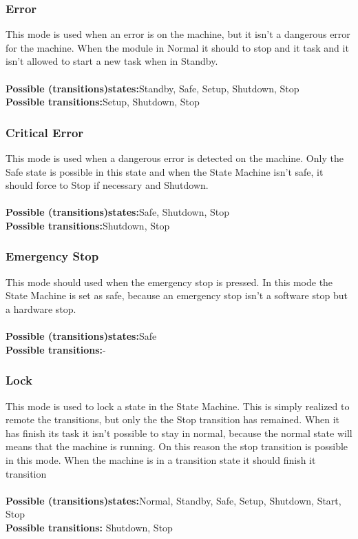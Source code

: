 \documentclass[12pt,a4paper]{report}
\begin{document}
\subsubsection{Error}This mode is used when an error is on the machine, but it isn't a dangerous error for the machine. When the module in Normal it should to stop and it task and it isn't allowed to start a new task when in Standby.\\\\
\textbf{Possible (transitions)states:}Standby, Safe, Setup, Shutdown, Stop\\
\textbf{Possible transitions:}Setup, Shutdown, Stop

\subsubsection{Critical Error}This mode is used when a dangerous error is detected on the machine. Only the Safe state is possible in this state and when the State Machine isn't safe, it should force to Stop if necessary and Shutdown.\\\\
\textbf{Possible (transitions)states:}Safe, Shutdown, Stop\\
\textbf{Possible transitions:}Shutdown, Stop

\subsubsection{Emergency Stop}This mode should used when the emergency stop is pressed. In this mode the State Machine is set as safe, because an emergency stop isn't a software stop but a hardware stop.\\\\
\textbf{Possible (transitions)states:}Safe\\
\textbf{Possible transitions:}-

\subsubsection{Lock}This mode is used to lock a state in the State Machine. This is simply realized to remote the transitions, but only the the Stop transition has remained. When it has finish its task it isn't possible to stay in normal, because the normal state will means that the machine is running. On this reason the stop transition is possible in this mode. When the machine is in a transition state it should finish it transition\\\\
\textbf{Possible (transitions)states:}Normal, Standby, Safe, Setup, Shutdown, Start, Stop\\
\textbf{Possible transitions:} Shutdown, Stop
\end{document}
